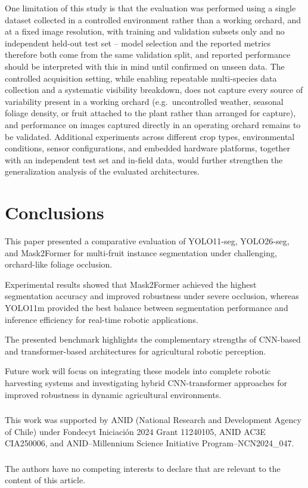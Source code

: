 \documentclass[runningheads]{llncs}
\begin{document}
One limitation of this study is that the evaluation was performed using a
single dataset collected in a controlled environment rather than a working
orchard, and at a fixed image resolution, with training and
validation subsets only and no independent held-out test set -- model
selection and the reported metrics therefore both come from the same
validation split, and reported performance should be interpreted with this in
mind until confirmed on unseen data. The controlled acquisition setting, while
enabling repeatable multi-species data collection and a systematic visibility
breakdown, does not capture every source of variability present in a working
orchard (e.g.\ uncontrolled weather, seasonal foliage density, or fruit
attached to the plant rather than arranged for capture), and performance on
images captured directly in an operating orchard remains to be validated.
Additional experiments across different crop types, environmental conditions,
sensor configurations, and embedded hardware platforms, together with an
independent test set and in-field data, would further strengthen the
generalization analysis of the evaluated architectures.


\section{Conclusions}
\label{Sec::Conclusions}

This paper presented a comparative evaluation of YOLO11-seg, YOLO26-seg, and Mask2Former for multi-fruit instance segmentation under challenging, orchard-like foliage occlusion.

Experimental results showed that Mask2Former achieved the highest segmentation accuracy and improved robustness under severe occlusion, whereas YOLO11m provided the best balance between segmentation performance and inference efficiency for real-time robotic applications.

The presented benchmark highlights the complementary strengths of CNN-based and transformer-based architectures for agricultural robotic perception.

Future work will focus on integrating these models into complete robotic harvesting systems and investigating hybrid CNN-transformer approaches for improved robustness in dynamic agricultural environments.

\begin{credits}
\subsubsection{\ackname} This work was supported by ANID (National Research and Development Agency of Chile) under Fondecyt Iniciación 2024 Grant 11240105, ANID AC3E CIA250006, and ANID--Millennium Science Initiative Program--NCN2024\_047.

\subsubsection{\discintname}
The authors have no competing interests to declare that are relevant to the content of this article.
\end{credits}




\end{document}
